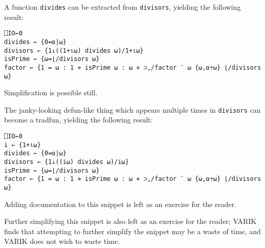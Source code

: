 \documentclass{report}
\begin{document}
A function \texttt{divides} can be extracted from \texttt{divisors}, yielding the following result:
\begin{lstlisting}
⎕IO←0
divides ← {0=⍺|⍵}
divisors ← {1↓((1+⍳⍵) divides ⍵)/1+⍳⍵}
isPrime ← {⍵=⌊/divisors ⍵}
factor ← {1 = ⍵ : 1 ⋄ isPrime ⍵ : ⍵ ⋄ ⊃,/factor ¨ ⍵ {⍵,⍺÷⍵} ⌊/divisors ⍵}
\end{lstlisting}
Simplification is possible still.

The janky-looking defun-like thing which appears multiple times in \texttt{divisors} can become a tradfun, yielding the following result:
\begin{lstlisting}
⎕IO←0
i ← {1+⍳⍵}
divides ← {0=⍺|⍵}
divisors ← {1↓((i⍵) divides ⍵)/i⍵}
isPrime ← {⍵=⌊/divisors ⍵}
factor ← {1 = ⍵ : 1 ⋄ isPrime ⍵ : ⍵ ⋄ ⊃,/factor ¨ ⍵ {⍵,⍺÷⍵} ⌊/divisors ⍵}
\end{lstlisting}
Adding documentation to this snippet is left as an exercise for the reader.

Further simplifying this snippet is also left as an exercise for the reader; VARIK finds that attempting to further simplify the snippet may be a waste of time, and VARIK does not wish to waste time.
\end{document}
